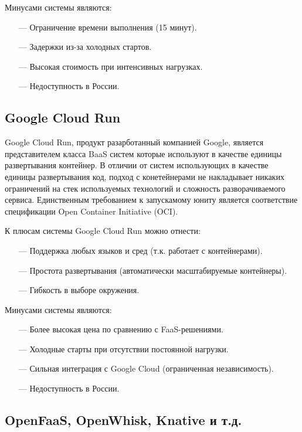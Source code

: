 Минусами системы являются:
\begin{itemize}
    \item[---]Ограничение времени выполнения (15 минут).
    \item[---]Задержки из-за холодных стартов.
    \item[---]Высокая стоимость при интенсивных нагрузках.
    \item[---]Недоступность в России.
\end{itemize}

\subsection{Google Cloud Run}

Google Cloud Run, продукт разарботанный компанией Google, является представителем класса BaaS систем которые используют в качестве единицы развертывания контейнер.
В отличии от систем использующих в качестве единицы развертывания код, подход с конетейнерами не накладывает никаких ограничений на стек используемых технологий и сложность разворачиваемого сервиса. Единственным требованием к запускамому юниту является соответствие спецификации Open Container Initiative (OCI)\cite{initiativeopen}.

К плюсам системы Google Cloud Run можно отнести:
\begin{itemize}
    \item[---]Поддержка любых языков и сред (т.к. работает с контейнерами).
    \item[---]Простота развертывания (автоматически масштабируемые контейнеры).
    \item[---]Гибкость в выборе окружения.
\end{itemize}

Минусами системы являются:
\begin{itemize}
    \item[---]Более высокая цена по сравнению с FaaS-решениями.
    \item[---]Холодные старты при отсутствии постоянной нагрузки.
    \item[---]Сильная интеграция с Google Cloud (ограниченная независимость).
    \item[---]Недоступность в России.
\end{itemize}

\subsection{OpenFaaS, OpenWhisk, Knative и т.д.}

